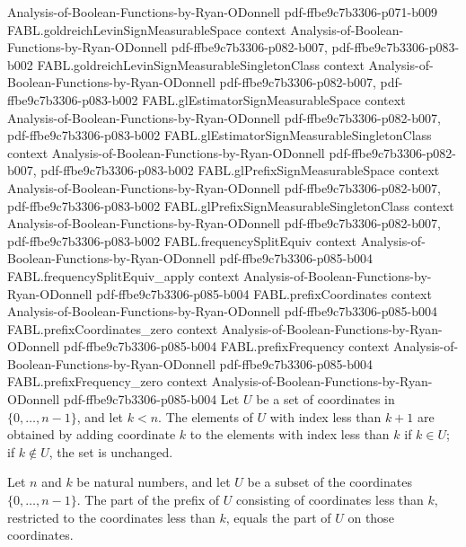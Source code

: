 \begin{theorem}
  {Analysis-of-Boolean-Functions-by-Ryan-ODonnell}
  {pdf-ffbe9c7b3306-p071-b009}
\proofstep
  {FABL.goldreichLevinSignMeasurableSpace}
  {context}
  {Analysis-of-Boolean-Functions-by-Ryan-ODonnell}
  {pdf-ffbe9c7b3306-p082-b007,
    pdf-ffbe9c7b3306-p083-b002}
\proofstep
  {FABL.goldreichLevinSignMeasurableSingletonClass}
  {context}
  {Analysis-of-Boolean-Functions-by-Ryan-ODonnell}
  {pdf-ffbe9c7b3306-p082-b007,
    pdf-ffbe9c7b3306-p083-b002}
\proofstep
  {FABL.glEstimatorSignMeasurableSpace}
  {context}
  {Analysis-of-Boolean-Functions-by-Ryan-ODonnell}
  {pdf-ffbe9c7b3306-p082-b007,
    pdf-ffbe9c7b3306-p083-b002}
\proofstep
  {FABL.glEstimatorSignMeasurableSingletonClass}
  {context}
  {Analysis-of-Boolean-Functions-by-Ryan-ODonnell}
  {pdf-ffbe9c7b3306-p082-b007,
    pdf-ffbe9c7b3306-p083-b002}
\proofstep
  {FABL.glPrefixSignMeasurableSpace}
  {context}
  {Analysis-of-Boolean-Functions-by-Ryan-ODonnell}
  {pdf-ffbe9c7b3306-p082-b007,
    pdf-ffbe9c7b3306-p083-b002}
\proofstep
  {FABL.glPrefixSignMeasurableSingletonClass}
  {context}
  {Analysis-of-Boolean-Functions-by-Ryan-ODonnell}
  {pdf-ffbe9c7b3306-p082-b007,
    pdf-ffbe9c7b3306-p083-b002}
\proofstep
  {FABL.frequencySplitEquiv}
  {context}
  {Analysis-of-Boolean-Functions-by-Ryan-ODonnell}
  {pdf-ffbe9c7b3306-p085-b004}
\proofstep
  {FABL.frequencySplitEquiv_apply}
  {context}
  {Analysis-of-Boolean-Functions-by-Ryan-ODonnell}
  {pdf-ffbe9c7b3306-p085-b004}
\proofstep
  {FABL.prefixCoordinates}
  {context}
  {Analysis-of-Boolean-Functions-by-Ryan-ODonnell}
  {pdf-ffbe9c7b3306-p085-b004}
\proofstep
  {FABL.prefixCoordinates_zero}
  {context}
  {Analysis-of-Boolean-Functions-by-Ryan-ODonnell}
  {pdf-ffbe9c7b3306-p085-b004}
\proofstep
  {FABL.prefixFrequency}
  {context}
  {Analysis-of-Boolean-Functions-by-Ryan-ODonnell}
  {pdf-ffbe9c7b3306-p085-b004}
\proofstep
  {FABL.prefixFrequency_zero}
  {context}
  {Analysis-of-Boolean-Functions-by-Ryan-ODonnell}
  {pdf-ffbe9c7b3306-p085-b004}
Let $U$ be a set of coordinates in $\{0,\ldots,n-1\}$, and let $k<n$. The elements of
$U$ with index less than $k+1$ are obtained by adding coordinate $k$ to the elements
with index less than $k$ if $k\in U$; if $k\notin U$, the set is unchanged.
\end{theorem}

\begin{theorem}
\label{FABL.freeFrequencyPart_prefixFrequency}
\leanok
{}
Let $n$ and $k$ be natural numbers, and let $U$ be a subset of the coordinates
$\{0,\ldots,n-1\}$. The part of the prefix of $U$ consisting of coordinates less than
$k$, restricted to the coordinates less than $k$, equals the part of $U$ on those
coordinates.
\end{theorem}

